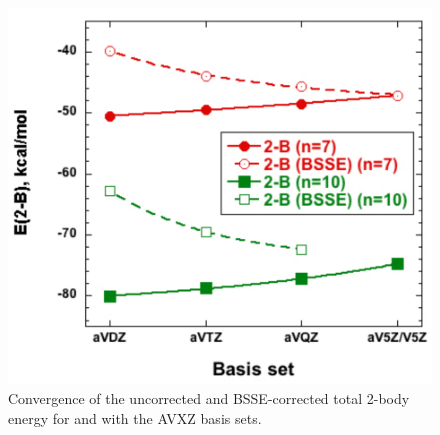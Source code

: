 \begin{figure}[h]
\uwsinglespace
\centering
\includegraphics[width=.7\textwidth]{Figures/Chapter_2/E_2B_7_10.pdf}
\caption[Convergence of the uncorrected and BSSE-corrected total 2-body energy for  and  with the AVXZ basis sets.]{Convergence of the uncorrected and BSSE-corrected total 2-body energy for  and  with the AVXZ basis sets.}
\label{fig:MBE_I_F6}
\end{figure}